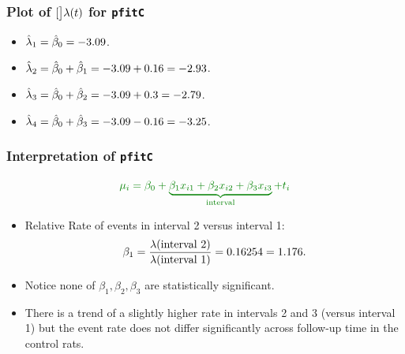 \documentclass[oneside]{book}\usepackage[]{graphicx}\usepackage[svgnames]{xcolor}
\let\exp\relax%
\let\log\relax%
\begin{document}
\subsubsection*{Plot of $\log[\big]{\lambda(t)}$ for \texttt{pfitC}}
\begin{center}
\end{center}
\begin{itemize}
      \item $ \log{\hat{\lambda}_1}=\hat{\beta}_0=-3.09 $.
      \item $ \log{\hat{\lambda}_2}=\hat{\beta}_0+\hat{\beta}_1=-3.09+0.16=-2.93 $.
      \item $ \log{\hat{\lambda}_3}=\hat{\beta}_0+\hat{\beta}_2=-3.09+0.3=-2.79 $.
      \item $ \log{\hat{\lambda}_4}=\hat{\beta}_0+\hat{\beta}_3=-3.09-0.16=-3.25 $.
\end{itemize}
\subsubsection*{Interpretation of \texttt{pfitC}}
\[ \textcolor{Green}{\log{\mu_i}=\beta_0+\underbrace{\beta_1x_{i1}+\beta_2x_{i2}+\beta_3x_{i3}}_{\text{interval}}+\log{t_i}} \]
\begin{itemize}
      \item Relative Rate of events in interval 2 versus interval 1:
            \[ \exp{\beta_1}=\frac{\lambda(\text{interval 2})}{\lambda(\text{interval 1})}=\exp{0.16254}=1.176. \]
      \item Notice none of $ \beta_1,\beta_2,\beta_3 $ are statistically significant.
      \item There is a trend of a slightly higher rate in intervals 2 and 3 (versus interval 1) but
            the event rate does not differ significantly across follow-up time in the control rats.
\end{itemize}
\end{document}
